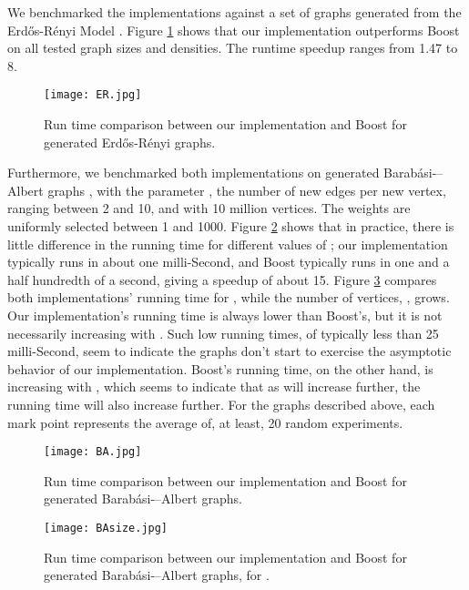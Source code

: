 \documentclass[conference,10pt,twocolumn]{IEEEtran}
\begin{document}
We benchmarked the implementations against a set of graphs generated from the Erd\H{o}s-R\'{e}nyi Model \cite{Erdos}. Figure \ref{fig:ER-time} shows that our implementation outperforms Boost on all tested graph sizes and densities. The runtime speedup ranges from 1.47 to 8.

\begin{figure}[ht!]
\begin{center}
\texttt{[image: ER.jpg]}
\caption{Run time comparison between our implementation and Boost for generated Erd\H{o}s-R\'{e}nyi graphs. }
\label{fig:ER-time}
\end{center}
\end{figure}

Furthermore, we benchmarked both implementations on generated Barab\'{a}si-–Albert graphs \cite{barabasi1999emergence}, with the parameter , the number of new edges per new vertex, ranging between 2 and 10, and with 10 million vertices. The weights are uniformly selected between 1 and 1000. Figure \ref{fig:BA-time} shows that in practice, there is little difference in the running time for different values of ; our implementation typically runs in about one milli-Second, and Boost typically runs in one and a half hundredth of a second, giving a speedup of about 15. Figure \ref{fig:BA-size} compares both implementations' running time for , while the number of vertices, , grows. Our implementation's running time is always lower than Boost's, but it is not necessarily increasing with . Such low running times, of typically less than 25 milli-Second, seem to indicate the graphs don't start to exercise the asymptotic behavior of our implementation. Boost's running time, on the other hand, is increasing with , which seems to indicate that as  will increase further, the running time will also increase further. For the graphs described above, each mark point represents the average of, at least, 20 random experiments.

\begin{figure}[ht!]
\begin{center}
\texttt{[image: BA.jpg]}
\caption{Run time comparison between our implementation and Boost for generated Barab\'{a}si-–Albert graphs. }
\label{fig:BA-time}
\end{center}
\end{figure}

\begin{figure}[ht!]
\begin{center}
\texttt{[image: BAsize.jpg]}
\caption{Run time comparison between our implementation and Boost for generated Barab\'{a}si-–Albert graphs, for . }
\label{fig:BA-size}
\end{center}
\end{figure}
\end{document}
